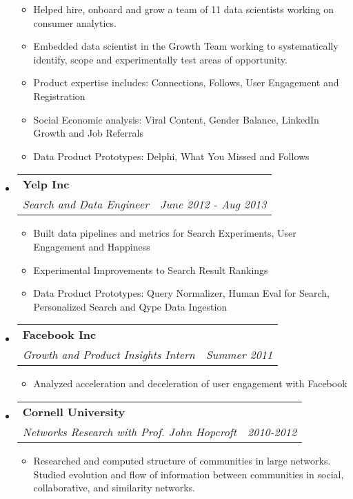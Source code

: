 \documentclass[letterpaper,11pt]{article}
\makeatletter
\newcommand{\resitem}[1]{\item #1 \vspace{-2pt}}
\newcommand{\ressubheading}[4]{

\begin{tabular*}{6.5in}{l@{\cftdotfill{\cftsecdotsep}\extracolsep{\fill}}r}

		\textbf{#1} & #2 \\

		\textit{#3} & \textit{#4} \\

\end{tabular*}\vspace{-6pt}}
\makeatother
\begin{document}
\begin{itemize}
	\begin{itemize}
	
		\resitem{Helped hire, onboard and grow a team of 11 data scientists working on consumer analytics.}
		
		\resitem{Embedded data scientist in the Growth Team working to systematically identify, scope and experimentally test areas of opportunity.}

		\resitem{Product expertise includes: Connections, Follows, User Engagement and Registration}

		\resitem{Social Economic analysis: Viral Content, Gender Balance, LinkedIn Growth and Job Referrals}
		
		\resitem{Data Product Prototypes: Delphi, What You Missed and Follows}
		
	\end{itemize}

\item 
	\ressubheading{\color{yelpcolor}Yelp Inc}{}{Search and Data Engineer}{June 2012 - Aug 2013}

	\begin{itemize}
		\resitem{Built data pipelines and metrics for Search Experiments, User Engagement and Happiness}

		\resitem{Experimental Improvements to Search Result Rankings}

		\resitem{Data Product Prototypes: Query Normalizer, Human Eval for Search, Personalized Search and Qype Data Ingestion}

	\end{itemize}


\item

	\ressubheading{\color{facebookcolor}Facebook Inc}{}{Growth and Product Insights Intern}{Summer 2011}

	\begin{itemize}

		\resitem{Analyzed acceleration and deceleration of user engagement with Facebook}

	\end{itemize}


\item
	\ressubheading{\color{darkred}Cornell University}{}{Networks Research with Prof. John Hopcroft }{2010-2012}

	\begin{itemize}

		\resitem{Researched and computed structure of communities in large networks. Studied evolution and flow of information between communities in social, collaborative, and similarity networks.}


\end{itemize}
\end{itemize}
\end{document}
